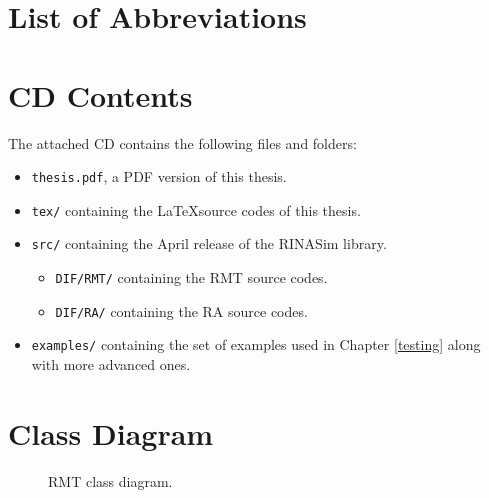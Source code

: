 \chapter{List of Abbreviations}

\chapter{CD Contents}
    The attached CD contains the following files and folders:

    \begin{itemize}
        \item \texttt{thesis.pdf}, a PDF version of this thesis.
        \item \texttt{tex/} containing the \LaTeX source codes of this thesis.
        \item \texttt{src/} containing the April release of the RINASim library.
        \begin{itemize}
            \item \texttt{DIF/RMT/} containing the RMT source codes.
            \item \texttt{DIF/RA/} containing the RA source codes.
        \end{itemize}
        \item \texttt{examples/} containing the set of examples used in Chapter \ref{testing} along with more advanced ones.
    \end{itemize}

\chapter{Class Diagram}\label{appendix:class}
    \newpage
    \begin{figure}[H]
        \begin{center}
          \caption{RMT class diagram.}
          \label{fig:rinasim:rmt-erd}
        \end{center}
    \end{figure}